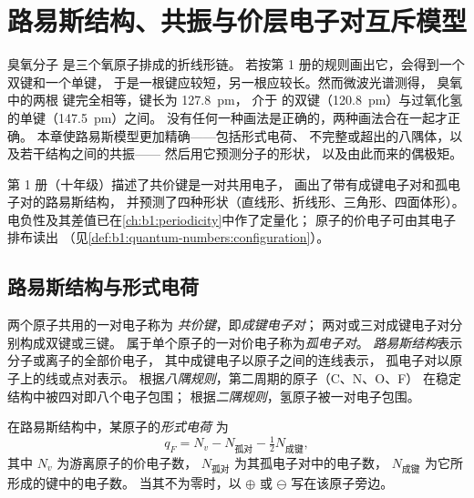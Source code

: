 \chapter{路易斯结构、共振与价层电子对互斥模型}\label{ch:b1:lewis-resonance-vsepr}

臭氧分子  是三个氧原子排成的折线形链。
若按第 1 册的规则画出它，会得到一个双键和一个单键，
于是一根键应较短，另一根应较长。然而微波光谱测得，
臭氧中的两根  键完全相等，键长为 \qty{127.8}{pm}，
介于  的双键（\qty{120.8}{pm}）与过氧化氢的单键（\qty{147.5}{pm}）之间。
没有任何一种画法是正确的，两种画法合在一起才正确。
本章使路易斯模型更加精确——包括形式电荷、
不完整或超出的八隅体，以及若干结构之间的共振——
然后用它预测分子的形状，
以及由此而来的偶极矩。

\begin{recall}
第 1 册（十年级）描述了共价键是一对共用电子，
画出了带有成键电子对和孤电子对的路易斯结构，
并预测了四种形状（直线形、折线形、三角形、四面体形）。
电负性及其差值已在\cref{ch:b1:periodicity}中作了定量化；
原子的价电子可由其电子排布读出
（见\cref{def:b1:quantum-numbers:configuration}）。
\end{recall}

\section{路易斯结构与形式电荷}

\begin{definition}\label{def:b1:lewis-resonance-vsepr:lewis}
两个原子共用的一对电子称为
\emph{共价键}，即\emph{成键电子对}；
两对或三对成键电子对分别构成双键或三键。
属于单个原子的一对价电子称为\emph{孤电子对}。
\emph{路易斯结构}表示分子或离子的全部价电子，
其中成键电子以原子之间的连线表示，
孤电子对以原子上的线或点对表示。
根据\emph{八隅规则}，第二周期的原子（C、N、O、F）
在稳定结构中被四对即八个电子包围；
根据\emph{二隅规则}，氢原子被一对电子包围。
\end{definition}

\begin{definition}[形式电荷]\label{def:b1:lewis-resonance-vsepr:formal-charge}
在路易斯结构中，某原子的\emph{形式电荷}
为
\[
  q_F = N_v - N_{\text{孤对}} - \tfrac12 N_{\text{成键}},
\]
其中 $N_v$ 为游离原子的价电子数，
$N_{\text{孤对}}$ 为其孤电子对中的电子数，
$N_{\text{成键}}$ 为它所形成的键中的电子数。
当其不为零时，以 $\oplus$ 或 $\ominus$ 写在该原子旁边。
\end{definition}

